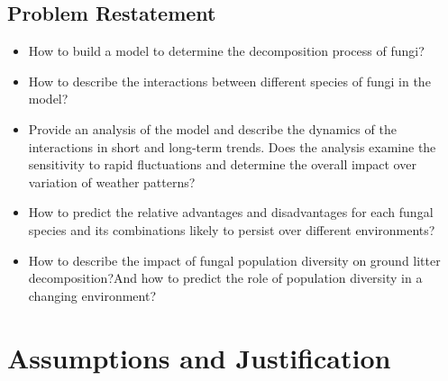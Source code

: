 \documentclass{mcmthesis}
\begin{document}
\subsection{Problem Restatement}
\begin{itemize}
	\item
	How to build a model to determine the decomposition process of fungi?
	\item
	How to describe the interactions between different species of fungi in the model?
	\item
	Provide an analysis of the model and describe the dynamics of the interactions in short and long-term trends. Does the analysis examine the sensitivity to rapid fluctuations and determine the overall impact over variation of weather patterns?
	\item
	How to predict the relative advantages and disadvantages for each fungal species and its combinations likely to persist over different environments?
	\item
	How to describe the impact of fungal population diversity on ground litter decomposition?And how to predict the role of population diversity in a changing environment?
\end{itemize}

\section{Assumptions and Justification}
\end{document}
